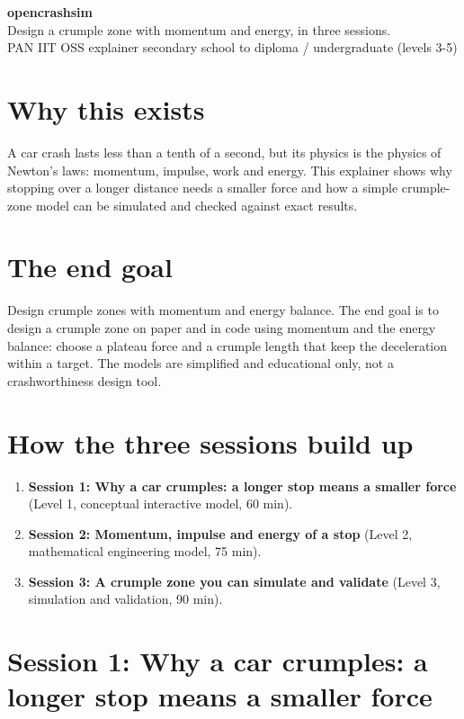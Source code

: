 \documentclass[11pt,a4paper]{article}
\begin{document}
\begin{center}{\LARGE\bfseries opencrashsim}\\[0.4em]{\large Design a crumple zone with momentum and energy, in three sessions.}\\[0.2em]\small PAN IIT OSS explainer \textbullet{} secondary school to diploma / undergraduate (levels 3-5)\end{center}

\section*{Why this exists}
A car crash lasts less than a tenth of a second, but its physics is the physics of Newton's laws: momentum, impulse, work and energy. This explainer shows why stopping over a longer distance needs a smaller force and how a simple crumple-zone model can be simulated and checked against exact results.

\section*{The end goal}
Design crumple zones with momentum and energy balance. The end goal is to design a crumple zone on paper and in code using momentum and the energy balance: choose a plateau force and a crumple length that keep the deceleration within a target. The models are simplified and educational only, not a crashworthiness design tool.

\section*{How the three sessions build up}
\begin{enumerate}[nosep]
\item \textbf{Session 1: Why a car crumples: a longer stop means a smaller force} (Level 1, conceptual interactive model, 60 min).
\item \textbf{Session 2: Momentum, impulse and energy of a stop} (Level 2, mathematical engineering model, 75 min).
\item \textbf{Session 3: A crumple zone you can simulate and validate} (Level 3, simulation and validation, 90 min).
\end{enumerate}

\section{Session 1: Why a car crumples: a longer stop means a smaller force}
\end{document}
